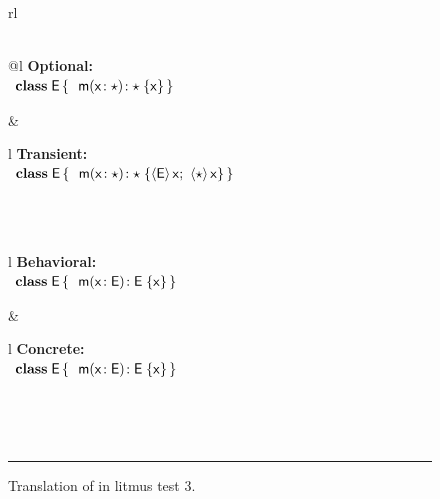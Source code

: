 \documentclass[USenglish]{tex/lipics-v2016}f
\begin{document}
\begin{figure}[!h]\small
\hrulefill\\
\\
\begin{tabular}{rl}
\\[2mm]\\
\begin{tabular}{@{}l}
{\bf Optional:}\\[2mm]
\(\begin{array}{l@{\,}l}
\Class{\xt E}{}{&\Mdef\m\x{\any}{\any}\x } \\
\end{array}\) 
\end{tabular}&
\begin{tabular}{l}
{\bf Transient:}\\[2mm]
\(\begin{array}{l@{\,}l}
\Class{\xt E}{}{&\Mdef\m\x\any\any{\SubCast{\xt E}\x ; ~ \SubCast{\any}{\x}}} \\
\end{array}\)
\end{tabular}\\\\
\begin{tabular}{l}
{\bf Behavioral:}\\[2mm]
\(\begin{array}{l@{\,}l}
\Class{\xt E}{}{&\Mdef\m\x{\xt E}{\xt E}\x} \\
\end{array}\) 
\end{tabular} &
\begin{tabular}{l}
{\bf Concrete:}\\[2mm]
\(\begin{array}{l@{\,}l}
\Class{\xt E}{}{&\Mdef\m\x{\xt E}{\xt E}\x} \\
\end{array}\) 
\end{tabular}\\
\end{tabular}\vspace{2mm}\\
\hrule\vspace{4mm}
  
 \caption{Translation of  in litmus test 3.}  \label{fig:l3etrans}
\end{figure}
\end{document}
